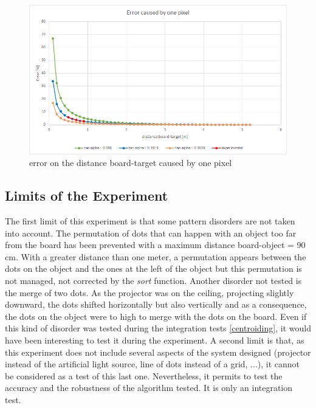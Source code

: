 \begin{figure}[H]
  \centerline{\includegraphics[scale=0.7]{fig/error.png}}
  \caption{error on the distance board-target caused by one pixel}
  \label{fig:error}
\end{figure}



\subsection{Limits of the Experiment}
The first limit of this experiment is that some pattern disorders are not taken into account. The permutation of dots that can happen with an object too far from the board has been prevented with a maximum distance board-object = 90 cm. With a greater distance than one meter, a permutation appears between the dots on the object and the ones at the left of the object but this permutation is not managed, not corrected by the \emph{sort} function. Another disorder not tested is the merge of two dots. As the projector was on the ceiling, projecting slightly downward, the dots shifted horizontally but also vertically and as a consequence, the dots on the object were to high to merge with the dots on the board. Even if this kind of disorder was tested during the integration tests \ref{centroiding}, it would have been interesting to test it during the experiment.
A second limit is that, as this experiment does not include several aspects of the system designed (projector instead of the artificial light source, line of dots instead of a grid, ...), it cannot be considered as a test of this last one. Nevertheless, it permits to test the accuracy and the robustness of the algorithm tested. It is only an integration test.





